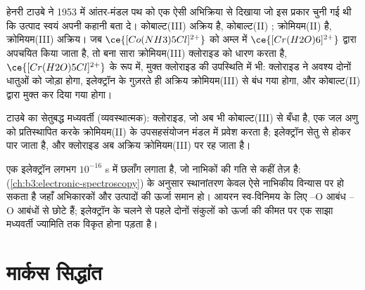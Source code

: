 हेनरी टाउबे ने 1953 में आंतर-मंडल पथ को एक ऐसी अभिक्रिया से दिखाया जो इस प्रकार चुनी गई थी कि
उत्पाद स्वयं अपनी कहानी बता दे। कोबाल्ट(III) अक्रिय है, कोबाल्ट(II) ; क्रोमियम(II)
 है, क्रोमियम(III) अक्रिय। जब $\ce{[Co(NH3)5Cl]^{2+}}$ को अम्ल में $\ce{[Cr(H2O)6]^{2+}}$ द्वारा
अपचयित किया जाता है, तो बना सारा क्रोमियम(III) क्लोराइड को धारण करता है, $\ce{[Cr(H2O)5Cl]^{2+}}$ के रूप में, मुक्त
क्लोराइड की उपस्थिति में भी: क्लोराइड ने अवश्य दोनों धातुओं को जोड़ा होगा,
इलेक्ट्रॉन के गुज़रते ही अक्रिय क्रोमियम(III) से बंध गया होगा, और
 कोबाल्ट(II) द्वारा मुक्त कर दिया गया होगा।

\begin{omfigure}

{\small टाउबे का सेतुबद्ध मध्यवर्ती (व्यवस्थात्मक): क्लोराइड, जो अब भी
कोबाल्ट(III) से बँधा है, एक जल अणु को प्रतिस्थापित करके क्रोमियम(II) के उपसहसंयोजन मंडल में
प्रवेश करता है; इलेक्ट्रॉन सेतु से होकर पार जाता है, और क्लोराइड
अब अक्रिय क्रोमियम(III) पर रह जाता है।}
\end{omfigure}

एक इलेक्ट्रॉन लगभग $10^{-16}$ s में छलाँग लगाता है, जो नाभिकों की गति से कहीं तेज़ है:
 (\cref{ch:b3:electronic-spectroscopy}) के अनुसार स्थानांतरण
केवल ऐसे नाभिकीय विन्यास पर हो सकता है जहाँ अभिकारकों और उत्पादों की
ऊर्जा समान हो। आयरन स्व-विनिमय के लिए --O आबंध
--O आबंधों से छोटे हैं; इलेक्ट्रॉन के चलने से पहले दोनों संकुलों को ऊर्जा की कीमत पर
एक साझा मध्यवर्ती ज्यामिति तक विकृत होना पड़ता है।

\section{मार्कस सिद्धांत}

